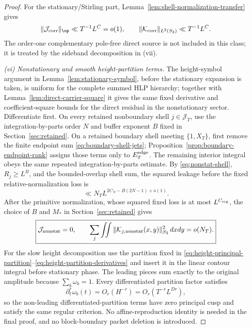 \begin{proof}
For the stationary/Stirling part,
Lemma~\ref{lem:shell-normalization-transfer} gives
\[
\|\mathcal J_{\rm corr}\|_{\op}\ll T^{-1}L^C=o(1),
\qquad
\|\mathcal K_{\rm corr}\|_{L^2(S_2)}\ll T^{-1}L^C.
\]
The order-one complementary pole-free direct source is not included in this
class; it is treated by the sideband decomposition in (vii).

\emph{(vi) Nonstationary and smooth height-partition terms.}
The height-symbol argument in Lemma~\ref{lem:stationary-symbol}, before the
stationary expansion is taken, is uniform for the complete summed HLP
hierarchy; together with Lemma~\ref{lem:direct-carrier-square} it gives the same
fixed derivative and coefficient-square bounds for the direct residual in the
nonstationary sector.  Differentiate first. On every retained nonboundary shell
$j\in\mathcal J_T$, use the integration-by-parts order $N$ and buffer exponent
$B$ fixed in
Section~\ref{sec:retained}. On a retained boundary shell meeting
$\{1,X_T\}$, first remove the finite endpoint sum
\eqref{eq:boundary-shell-jets}; Proposition~\ref{prop:boundary-endpoint-rank}
assigns those terms only to $E_T^{\rm edge}$. The remaining interior integral
obeys the same repeated integration-by-parts estimate. By
\eqref{eq:nonstat-shell}, $R_j\ge L^B$, and the bounded-overlap shell sum,
the squared leakage before the fixed relative-normalization loss is
\[
\ll N_TL^{2C_N-B(2N-1)+o(1)}.
\]
After the primitive normalization, whose squared fixed loss is at most
$L^{C_{\rm reg}}$, the choice of $B$ and $M_*$ in
Section~\ref{sec:retained} gives
\begin{equation}
\boxed{
\mathcal J_{\rm nonstat}=0,
\qquad
\sum_j\iint
\|\mathcal K_{j,\rm nonstat}(x,y)\|_{S_2}^2\,dxdy=o(N_T).
}
\label{eq:nonstat-relative-HS}
\end{equation}
For the slow height decomposition use the partition fixed in
\eqref{eq:height-principal-partition}--\eqref{eq:height-partition-derivatives}
and insert it in the linear contour integral before stationary phase.  The
leading pieces sum exactly to the original amplitude because
$\sum_b\omega_b=1$.  Every differentiated partition factor satisfies
\[
\partial_t^r\omega_b(t)=O_r(H^{-r})
=O_r(T^{-r}L^{Dr}),
\]
so the non-leading differentiated-partition terms have zero principal cusp and
satisfy the same regular criterion.  No affine-reproduction identity is needed
in the final proof, and no block-boundary packet deletion is introduced.


\end{proof}
